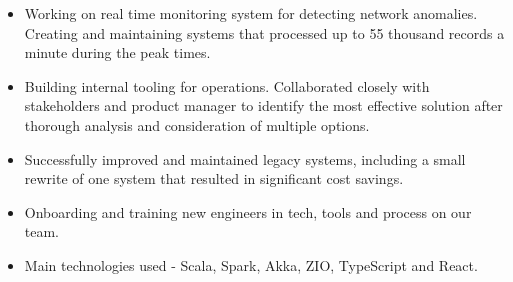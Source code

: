 \documentclass[10pt,a4paper,ragged2e]{altacv}
\begin{document}

\begin{fullwidth}
\makecvheader
\end{fullwidth}



\begin{itemize}
\item Working on real time monitoring system for detecting network anomalies. Creating and maintaining systems that processed up to 55 thousand records a minute during the peak times.
\smallskip
\item Building internal tooling for operations. Collaborated closely with stakeholders and product manager to identify the most effective solution after thorough analysis and consideration of multiple options.
\smallskip
\item Successfully improved and maintained legacy systems, including a small rewrite of one system that resulted in significant cost savings.
\smallskip
\item Onboarding and training new engineers in tech, tools and process on our team.
\smallskip
\item Main technologies used - Scala, Spark, Akka, ZIO, TypeScript and React.
\end{itemize}
\end{document}
